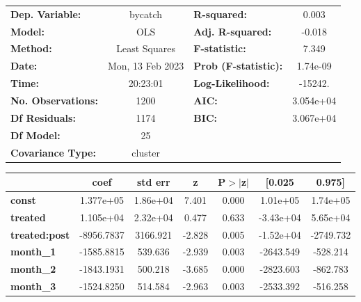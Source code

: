 \begin{center}
\begin{tabular}{lclc}
\toprule
\textbf{Dep. Variable:}    &     bycatch      & \textbf{  R-squared:         } &     0.003   \\
\textbf{Model:}            &       OLS        & \textbf{  Adj. R-squared:    } &    -0.018   \\
\textbf{Method:}           &  Least Squares   & \textbf{  F-statistic:       } &     7.349   \\
\textbf{Date:}             & Mon, 13 Feb 2023 & \textbf{  Prob (F-statistic):} &  1.74e-09   \\
\textbf{Time:}             &     20:23:01     & \textbf{  Log-Likelihood:    } &   -15242.   \\
\textbf{No. Observations:} &        1200      & \textbf{  AIC:               } & 3.054e+04   \\
\textbf{Df Residuals:}     &        1174      & \textbf{  BIC:               } & 3.067e+04   \\
\textbf{Df Model:}         &          25      & \textbf{                     } &             \\
\textbf{Covariance Type:}  &     cluster      & \textbf{                     } &             \\
\bottomrule
\end{tabular}
\begin{tabular}{lcccccc}
                      & \textbf{coef} & \textbf{std err} & \textbf{z} & \textbf{P$> |$z$|$} & \textbf{[0.025} & \textbf{0.975]}  \\
\midrule
\textbf{const}        &    1.377e+05  &     1.86e+04     &     7.401  &         0.000        &     1.01e+05    &     1.74e+05     \\
\textbf{treated}      &    1.105e+04  &     2.32e+04     &     0.477  &         0.633        &    -3.43e+04    &     5.65e+04     \\
\textbf{treated:post} &   -8956.7837  &     3166.921     &    -2.828  &         0.005        &    -1.52e+04    &    -2749.732     \\
\textbf{month\_1}     &   -1585.8815  &      539.636     &    -2.939  &         0.003        &    -2643.549    &     -528.214     \\
\textbf{month\_2}     &   -1843.1931  &      500.218     &    -3.685  &         0.000        &    -2823.603    &     -862.783     \\
\textbf{month\_3}     &   -1524.8250  &      514.584     &    -2.963  &         0.003        &    -2533.392    &     -516.258     \\

\end{tabular}
\end{center}
